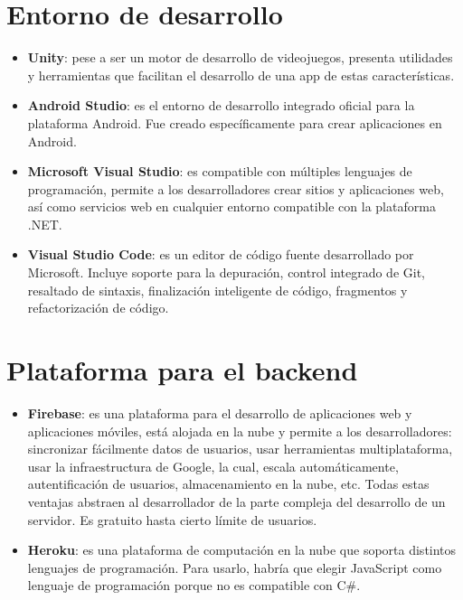 \documentclass{report}
\begin{document}
\section{Entorno de desarrollo}
\begin{itemize}
\item \textbf{Unity}: pese a ser un motor de desarrollo de videojuegos, presenta utilidades y herramientas que facilitan el desarrollo de una app de estas características.
\item \textbf{Android Studio}: es el entorno de desarrollo integrado oficial para la plataforma Android. Fue creado específicamente para crear aplicaciones en Android.
\item \textbf{Microsoft Visual Studio}: es compatible con múltiples lenguajes de programación, permite a los desarrolladores crear sitios y aplicaciones web, así como servicios web en cualquier entorno compatible con la plataforma .NET.
\item \textbf{Visual Studio Code}: es un editor de código fuente desarrollado por Microsoft. Incluye soporte para la depuración, control integrado de Git, resaltado de sintaxis, finalización inteligente de código, fragmentos y refactorización de código.
\end{itemize}

\section{Plataforma para el backend}
\begin{itemize}
\item \textbf{Firebase}: es una plataforma para el desarrollo de aplicaciones web y aplicaciones móviles, está alojada en la nube y permite a los desarrolladores: sincronizar fácilmente datos de usuarios, usar herramientas multiplataforma, usar la infraestructura de Google, la cual, escala automáticamente, autentificación de usuarios, almacenamiento en la nube, etc. Todas estas ventajas abstraen al desarrollador de la parte compleja del desarrollo de un servidor. Es gratuito hasta cierto límite de usuarios.
\item \textbf{Heroku}: es una plataforma de computación en la nube que soporta distintos lenguajes de programación. Para usarlo, habría que elegir JavaScript como lenguaje de programación porque no es compatible con C\#. 
\end{itemize}
\end{document}
